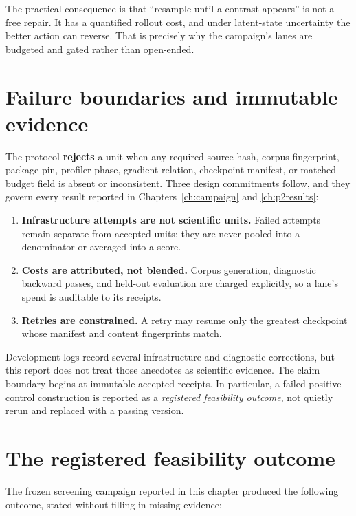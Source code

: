 The practical consequence is that ``resample until a contrast appears'' is not a
free repair. It has a quantified rollout cost, and under latent-state uncertainty
the better action can reverse. That is precisely why the campaign's lanes are
budgeted and gated rather than open-ended.

\section{Failure boundaries and immutable evidence}

The protocol \textbf{rejects} a unit when any required source hash, corpus
fingerprint, package pin, profiler phase, gradient relation, checkpoint manifest,
or matched-budget field is absent or inconsistent. Three design commitments
follow, and they govern every result reported in Chapters~\ref{ch:campaign} and
\ref{ch:p2results}:

\begin{enumerate}[leftmargin=1.6em,itemsep=3pt]
  \item \textbf{Infrastructure attempts are not scientific units.} Failed
  attempts remain separate from accepted units; they are never pooled into a
  denominator or averaged into a score.
  \item \textbf{Costs are attributed, not blended.} Corpus generation, diagnostic
  backward passes, and held-out evaluation are charged explicitly, so a lane's
  spend is auditable to its receipts.
  \item \textbf{Retries are constrained.} A retry may resume only the greatest
  checkpoint whose manifest and content fingerprints match.
\end{enumerate}

Development logs record several infrastructure and diagnostic corrections, but
this report does not treat those anecdotes as scientific evidence. The claim
boundary begins at immutable accepted receipts. In particular, a failed
positive-control construction is reported as a \emph{registered feasibility
outcome}, not quietly rerun and replaced with a passing version.

\section{The registered feasibility outcome}

The frozen screening campaign reported in this chapter produced the following
outcome, stated without filling in missing evidence:


